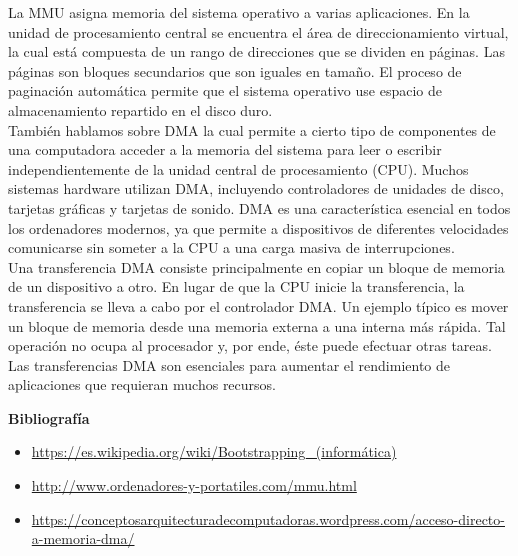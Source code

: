 \documentclass[11pt, a4paper]{report}
\begin{document}
La MMU asigna memoria del sistema operativo a varias aplicaciones. En la unidad
de procesamiento central se encuentra el área de direccionamiento virtual, la
cual está compuesta de un rango de direcciones que se dividen en páginas. Las
páginas son bloques secundarios que son iguales en tamaño. El proceso de
paginación automática permite que el sistema operativo use espacio de
almacenamiento repartido en el disco duro. \\

También hablamos sobre DMA la cual permite a cierto tipo de componentes de una
computadora acceder a la memoria del sistema para leer o escribir
independientemente de la unidad central de procesamiento (CPU). Muchos sistemas
hardware utilizan DMA, incluyendo controladores de unidades de disco, tarjetas
gráficas y tarjetas de sonido. DMA es una característica esencial en todos los
ordenadores modernos, ya que permite a dispositivos de diferentes velocidades
comunicarse sin someter a la CPU a una carga masiva de interrupciones. \\

Una transferencia DMA consiste principalmente en copiar un bloque de memoria de
un dispositivo a otro. En lugar de que la CPU inicie la transferencia, la
transferencia se lleva a cabo por el controlador DMA. Un ejemplo típico es
mover un bloque de memoria desde una memoria externa a una interna más rápida.
Tal operación no ocupa al procesador y, por ende, éste puede efectuar otras
tareas. Las transferencias DMA son esenciales para aumentar el rendimiento de
aplicaciones que requieran muchos recursos. \\





\newpage

\textbf{Bibliografía} \\

\begin{itemize}

\item \url{https://es.wikipedia.org/wiki/Bootstrapping_(informática)}
\item \url{http://www.ordenadores-y-portatiles.com/mmu.html}
\item \url{https://conceptosarquitecturadecomputadoras.wordpress.com/acceso-directo-a-memoria-dma/}
\end{itemize}
\end{document}
